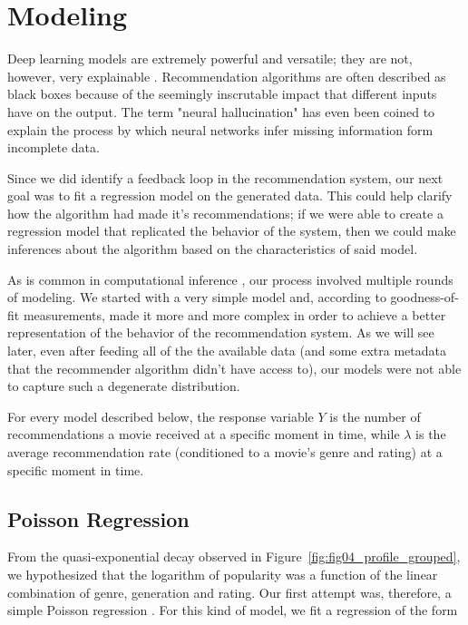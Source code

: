 \section{Modeling}
\label{sec:modeling04}

Deep learning models are extremely powerful and versatile; they are not,
however, very explainable \citep{roscher_explainable_2020}. Recommendation
algorithms are often described as black boxes because of the seemingly
inscrutable impact that different inputs have on the output. The term "neural
hallucination" \citep{raunak_curious_2021} has even been coined to explain the
process by which neural networks infer missing information form incomplete data.

Since we did identify a feedback loop in the recommendation system, our next
goal was to fit a regression model on the generated data. This could help
clarify how the algorithm had made it's recommendations; if we were able to
create a regression model that replicated the behavior of the system, then we
could make inferences about the algorithm based on the characteristics of said
model.

As is common in computational inference \citep{robert_james_2011}, our process
involved multiple rounds of modeling. We started with a very simple model and,
according to goodness-of-fit measurements, made it more and more complex in
order to achieve a better representation of the behavior of the recommendation
system. As we will see later, even after feeding all of the the available data
(and some extra metadata that the recommender algorithm didn't have access to),
our models were not able to capture such a degenerate distribution.

For every model described below, the response variable $Y$ is the number of
recommendations a movie received at a specific moment in time, while $\lambda$
is the average recommendation rate (conditioned to a movie's genre and rating)
at a specific moment in time.

\subsection{Poisson Regression}
\label{subsec:poisson04}

From the quasi-exponential decay observed in
Figure~\ref{fig:fig04_profile_grouped}, we hypothesized that the logarithm of
popularity was a function of the linear combination of genre, generation and
rating. Our first attempt was, therefore, a simple Poisson regression
\citep{allison_fixed-effects_2002}. For this kind of model, we fit a regression
of the form

